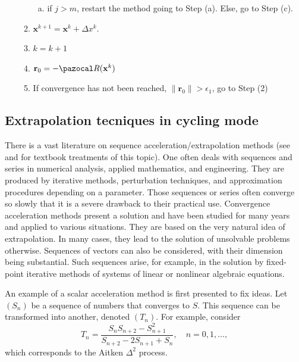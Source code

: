 \begin{framedbox}[htbp]
\begin{center}
\begin{minipage}{0.9\textwidth}
\begin{enumerate}[(i)]
\begin{enumerate}[(1)]
\begin{enumerate}[(a)]
        \item if \(j>m\), restart the method going to Step (a). Else, go to Step (c).
      \end{enumerate}
    \item \(\mathbf x^{k+1} = \mathbf x^k + \Delta x^k\).
    \item \(k=k+1\)
    \item \(\mathbf r_0 = -\pazocal R(\mathbf x^k)\)
    \item If convergence has not been reached, \(\|\mathbf r_0\| > \epsilon_1\), go to Step (2)
    \end{enumerate}
    \end{enumerate}
    \end{minipage}
  \end{center}
\end{framedbox}

\subsection{Extrapolation tecniques in cycling mode} \label{sec:vector_extrapolation}

There is a vast literature on sequence acceleration/extrapolation methods (see  \cite{brezinski_extrapolation_2013} and \cite{sidi_vector_2017} for textbook treatments of this topic).
One often deals with sequences and series in numerical analysis, applied mathematics, and engineering.
They are produced by iterative methods, perturbation techniques, and approximation procedures depending on a parameter.
Those sequences or series often converge so slowly that it is a severe drawback to their practical use.
Convergence acceleration methods present a solution and have been studied for many years and applied to various situations.
They are based on the very natural idea of extrapolation.
In many cases, they lead to the solution of unsolvable problems otherwise.
Sequences of vectors can also be considered, with their dimension being substantial.
Such sequences arise, for example, in the solution by fixed-point iterative methods of systems of linear or nonlinear algebraic equations.

An example of a scalar acceleration method is first presented to fix ideas.
Let \((S_n)\) be a sequence of numbers that converges to \(S\).
This sequence can be transformed into another, denoted \((T_n)\).
For example, consider
\begin{equation}
  T_n = \frac{S_n S_{n+2} - S^2_{n+1}}{S_{n+2}-2S_{n+1} + S_n},\quad n=0,1,\dots,
\end{equation}
which corresponds to the Aitken \(\Delta^2\) process.

